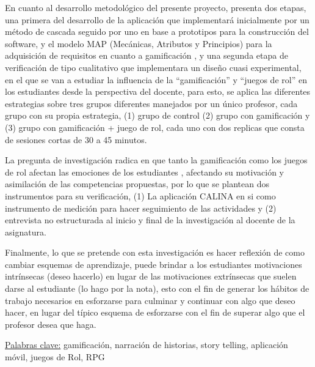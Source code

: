 \begin{singlespace}
En cuanto al desarrollo metodológico del presente proyecto, presenta dos etapas, una primera del desarrollo de 
la aplicación que implementará inicialmente por un método de cascada seguido por uno en base a prototipos para 
la construcción del software, y el modelo MAP (Mecánicas, Atributos y Principios) para la adquisición de 
requisitos en cuanto a gamificación \cite{CECHELLA2018}, y una segunda etapa de verificación de tipo 
cualitativo que implementara un diseño cuasi experimental, en el que se van a estudiar la influencia de la 
``gamificación'' y ``juegos de rol'' en los estudiantes desde la perspectiva del docente, para esto, se aplica 
las diferentes estrategias sobre tres grupos diferentes manejados por un único profesor, cada grupo con su 
propia estrategia, (1) grupo de control (2) grupo con gamificación y (3) grupo con gamificación + juego de rol, 
cada uno con dos replicas que consta de sesiones cortas de 30 a 45 minutos. 

La pregunta de investigación radica en que tanto la gamificación como los juegos de rol afectan las emociones 
de los estudiantes \cite{MULLINS2020304}, afectando su motivación y asimilación de las competencias 
propuestas, por lo que se plantean dos instrumentos para su verificación, (1) La aplicación CALINA en si como 
instrumento de medición para hacer seguimiento de las actividades y (2) entrevista no estructurada
al inicio y final de la investigación al docente de la asignatura. 

Finalmente, lo que se pretende con esta investigación es hacer reflexión de como cambiar esquemas de 
aprendizaje, puede brindar a los estudiantes motivaciones intrínsecas (deseo hacerlo) en lugar de las 
motivaciones extrínsecas que suelen darse al estudiante (lo hago por la nota), esto con el fin de generar los 
hábitos de trabajo necesarios en esforzarse para culminar y continuar con algo que deseo hacer, en lugar del 
típico esquema de esforzarse con el fin de superar algo que el profesor desea que haga.
\end{singlespace}

\uline{Palabras clave:} gamificación, narración de historias, story telling, aplicación móvil, juegos de Rol, RPG




